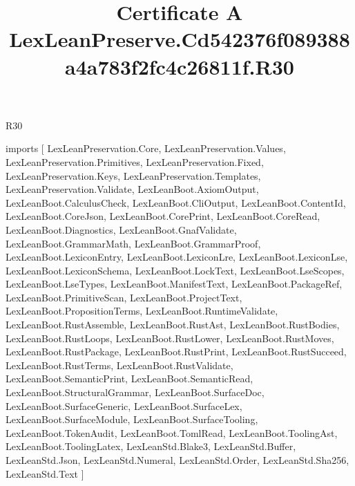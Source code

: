 \begin{lexlean}{R30}
\title{Certificate A LexLeanPreserve.Cd542376f089388a4a783f2fc4c26811f.R30}
\begin{coremodule}
imports [
  LexLeanPreservation.Core,
  LexLeanPreservation.Values,
  LexLeanPreservation.Primitives,
  LexLeanPreservation.Fixed,
  LexLeanPreservation.Keys,
  LexLeanPreservation.Templates,
  LexLeanPreservation.Validate,
  LexLeanBoot.AxiomOutput,
  LexLeanBoot.CalculusCheck,
  LexLeanBoot.CliOutput,
  LexLeanBoot.ContentId,
  LexLeanBoot.CoreJson,
  LexLeanBoot.CorePrint,
  LexLeanBoot.CoreRead,
  LexLeanBoot.Diagnostics,
  LexLeanBoot.GnafValidate,
  LexLeanBoot.GrammarMath,
  LexLeanBoot.GrammarProof,
  LexLeanBoot.LexiconEntry,
  LexLeanBoot.LexiconLre,
  LexLeanBoot.LexiconLse,
  LexLeanBoot.LexiconSchema,
  LexLeanBoot.LockText,
  LexLeanBoot.LseScopes,
  LexLeanBoot.LseTypes,
  LexLeanBoot.ManifestText,
  LexLeanBoot.PackageRef,
  LexLeanBoot.PrimitiveScan,
  LexLeanBoot.ProjectText,
  LexLeanBoot.PropositionTerms,
  LexLeanBoot.RuntimeValidate,
  LexLeanBoot.RustAssemble,
  LexLeanBoot.RustAst,
  LexLeanBoot.RustBodies,
  LexLeanBoot.RustLoops,
  LexLeanBoot.RustLower,
  LexLeanBoot.RustMoves,
  LexLeanBoot.RustPackage,
  LexLeanBoot.RustPrint,
  LexLeanBoot.RustSucceed,
  LexLeanBoot.RustTerms,
  LexLeanBoot.RustValidate,
  LexLeanBoot.SemanticPrint,
  LexLeanBoot.SemanticRead,
  LexLeanBoot.StructuralGrammar,
  LexLeanBoot.SurfaceDoc,
  LexLeanBoot.SurfaceGeneric,
  LexLeanBoot.SurfaceLex,
  LexLeanBoot.SurfaceModule,
  LexLeanBoot.SurfaceTooling,
  LexLeanBoot.TokenAudit,
  LexLeanBoot.TomlRead,
  LexLeanBoot.ToolingAst,
  LexLeanBoot.ToolingLatex,
  LexLeanStd.Blake3,
  LexLeanStd.Buffer,
  LexLeanStd.Json,
  LexLeanStd.Numeral,
  LexLeanStd.Order,
  LexLeanStd.Sha256,
  LexLeanStd.Text
]


\end{coremodule}
\end{lexlean}
